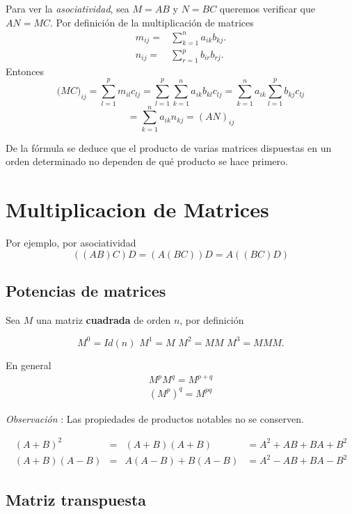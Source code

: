 \documentclass[
]{article}
\begin{document}
Para ver la \emph{asociatividad}, sea \(M=AB\) y \(N=BC\) queremos
verificar que \(AN = MC\). Por definición de la multiplicación de
matrices \[
\begin{array}{cc}
m_{ij} = & \sum_{k=1}^{n}a_{ik}b_{kj}. \\
n_{ij} = & \sum_{r=1}^{p}b_{ir}b_{rj}.
\end{array}
\] Entonces \[
\big( MC \big)_{ij}=\sum_{l=1}^{p}m_{il}c_{lj} = \sum_{l=1}^{p} \sum_{k=1}^n a_{ik}b_{kl}c_{lj} =  \sum_{k=1}^n a_{ik} \sum_{l=1}^{p}  b_{kj}c_{lj}
\] \[
=\sum_{k=1}^na_{ik}n_{kj}=(AN)_{ij}
\]

De la fórmula se deduce que el producto de varias matrices dispuestas en
un orden determinado no dependen de qué producto se hace primero.

\hypertarget{multiplicacion-de-matrices-1}{%
\section{Multiplicacion de
Matrices}\label{multiplicacion-de-matrices-1}}

\small

Por ejemplo, por asociatividad \[
((AB)C)D = (A(BC))D = A((BC)D)
\]

\hypertarget{potencias-de-matrices}{%
\subsection{Potencias de matrices}\label{potencias-de-matrices}}

Sea \(M\) una matriz \textbf{cuadrada} de orden \(n\), por definición

\begin{equation*}
M^{0}=Id(n)\,\,M^{1} = M\,\,  M^{2} = MM\,\, M^{3} = MMM.
\end{equation*}

En general \[
\begin{array}{cc}
M^{p}M^{q}= M^{p+q}\\
(M^{p})^{q} = M^{pq}
\end{array}
\]

\emph{Observación} : Las propiedades de productos notables no se
conserven.

\[
\begin{array}{cccc}
(A+B)^{2} & = & (A+B)(A+B) &= A^2 + AB + BA + B^2 \\
(A+B)(A-B) &= &A(A-B) + B(A-B)& = A^2 -AB + BA -B^2
\end{array}
\]

\hypertarget{matriz-transpuesta}{%
\subsection{Matriz transpuesta}\label{matriz-transpuesta}}
\end{document}

